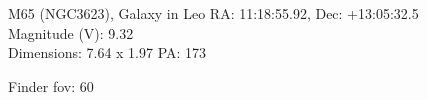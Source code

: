 \begin{block}{M65 (NGC3623), Galaxy in Leo}
    RA: 11:18:55.92, Dec: +13:05:32.5 \\ 
    Magnitude (V): 9.32 \\ 
    Dimensions: 7.64 x 1.97 PA: 173 

    Finder fov: 60 
\end{block}